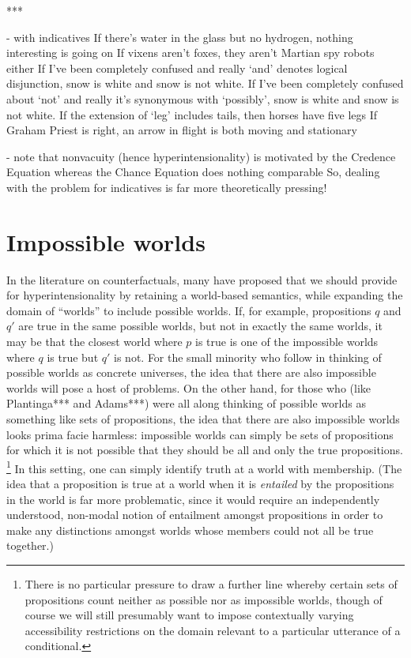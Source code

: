 \documentclass[If.tex]{subfiles}
\begin{document}
***


	- with indicatives
			If there's water in the glass but no hydrogen, nothing interesting is going on
			If vixens aren't foxes, they aren't Martian spy robots either
			If I've been completely confused and really ‘and’ denotes logical disjunction, snow is white and snow is not white.
			If I've been completely confused about ‘not’ and really it's synonymous with ‘possibly’, snow is white and snow is not white.
			If the extension of ‘leg’ includes tails, then horses have five legs
			If Graham Priest is right, an arrow in flight is both moving and stationary

	- note that nonvacuity (hence hyperintensionality) is motivated by the Credence Equation
		whereas the Chance Equation does nothing comparable
		So, dealing with the problem for indicatives is far more theoretically pressing!
		
	
\section{Impossible worlds}  \label{sect:impossibleworlds}
In the literature on counterfactuals, many have proposed that we should provide for hyperintensionality by retaining a world-based semantics, while expanding the domain of “worlds” to include possible worlds.  If, for example, propositions $q$ and $q'$ are true in the same possible worlds, but not in exactly the same worlds, it may be that the closest world where $p$ is true is one of the impossible worlds where $q$ is true but $q'$ is not.  For the small minority who follow \citet{LewisOPW} in thinking of possible worlds as concrete universes, the idea that there are also impossible worlds will pose a host of problems.  On the other hand, for those who (like Plantinga*** and Adams***) were all along thinking of possible worlds as something like sets of propositions, the idea that there are also impossible worlds looks prima facie harmless: impossible worlds can simply be sets of propositions for which it is not possible that they should be all and only the true propositions.%
\footnote{There is no particular pressure to draw a further line whereby certain sets of propositions count neither as possible nor as impossible worlds, though of course we will still presumably want to impose contextually varying accessibility restrictions on the domain relevant to a particular utterance of a conditional.}  
In this setting, one can simply identify truth at a world with membership.  (The idea that a proposition is true at a world when it is \emph{entailed} by the propositions in the world is far more problematic, since it would require an independently understood, non-modal notion of entailment amongst propositions in order to make any distinctions amongst worlds whose members could not all be true together.)
\end{document}
